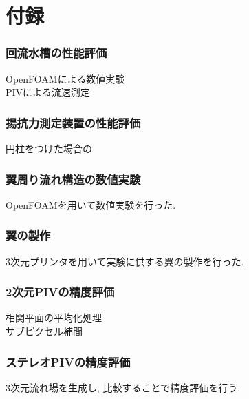 \section{付録}
\subsubsection{回流水槽の性能評価}

OpenFOAMによる数値実験\\

PIVによる流速測定\\



\subsubsection{揚抗力測定装置の性能評価}

円柱をつけた場合の



\subsubsection{翼周り流れ構造の数値実験}

OpenFOAMを用いて数値実験を行った. 

\subsubsection{翼の製作}

3次元プリンタを用いて実験に供する翼の製作を行った.

\subsubsection{2次元PIVの精度評価}

相関平面の平均化処理\\

サブピクセル補間\\


\subsubsection{ステレオPIVの精度評価}

3次元流れ場を生成し, 比較することで精度評価を行う.
